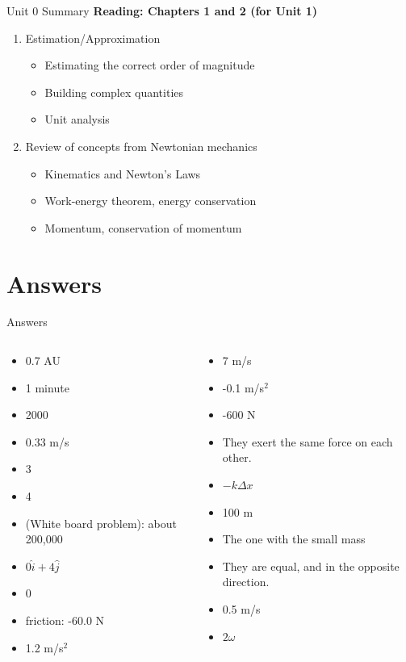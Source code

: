 \documentclass{beamer}
\begin{document}
\begin{frame}{Unit 0 Summary}
\textbf{Reading: Chapters 1 and 2 (for Unit 1)}
\begin{enumerate}
\item Estimation/Approximation
\begin{itemize}
\item \alert{Estimating} the correct order of magnitude
\item \alert{Building} complex quantities
\item \alert{Unit analysis}
\end{itemize}
\item Review of concepts from Newtonian mechanics
\begin{itemize}
\item Kinematics and \alert{Newton's Laws}
\item Work-energy theorem, energy conservation
\item Momentum, conservation of momentum
\end{itemize}
\end{enumerate}
\end{frame}

\section{Answers}

\begin{frame}{Answers}
\small
\begin{columns}[T]
\begin{column}{0.5\textwidth}
\begin{itemize}
\item 0.7 AU
\item 1 minute
\item 2000
\item 0.33 m/s
\item 3
\item 4
\item (White board problem): about 200,000
\item $0\hat{i}+4\hat{j}$
\item 0
\item friction: -60.0 N
\item 1.2 m/s$^2$
\end{itemize}
\end{column}
\begin{column}{0.5\textwidth}
\begin{itemize}
\item 7 m/s
\item -0.1 m/s$^2$
\item -600 N
\item They exert the same force on each other.
\item $-k \Delta x$
\item 100 m
\item The one with the small mass
\item They are equal, and in the opposite direction.
\item 0.5 m/s
\item $2\omega$
\end{itemize}
\end{column}
\end{columns}
\end{frame}
\end{document}
